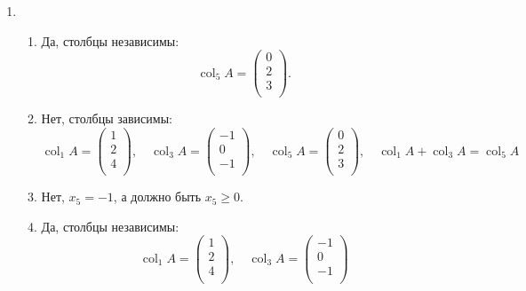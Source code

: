 \documentclass[12pt]{article}
\DeclareMathOperator{\col}{col}
\begin{document}
\begin{enumerate}
\item 
\begin{enumerate}
  \item Да, столбцы независимы:
  \[
  \col_5 A = \begin{pmatrix}
    0 \\ 
    2 \\ 
    3 \\
  \end{pmatrix}.
  \]
  \item Нет, столбцы зависимы:
  \[
  \col_1 A = \begin{pmatrix}
    1 \\
    2 \\
    4 \\
  \end{pmatrix}, \quad 
  \col_3 A = \begin{pmatrix}
    -1 \\
    0 \\
    -1 \\
  \end{pmatrix}, \quad 
  \col_5 A = \begin{pmatrix}
    0 \\ 
    2 \\ 
    3 \\
  \end{pmatrix}, \quad 
  \col_1 A + \col_3 A = \col_5 A
  \]
  \item Нет, $x_5  = -1$, а должно быть $x_5 \geq 0$. 
  \item Да, столбцы независимы:
  \[
    \col_1 A = \begin{pmatrix}
      1 \\
      2 \\
      4 \\
    \end{pmatrix}, \quad 
    \col_3 A = \begin{pmatrix}
      -1 \\
      0 \\
      -1 \\
    \end{pmatrix}
  \]

\end{enumerate}



\end{enumerate}
\end{document}
